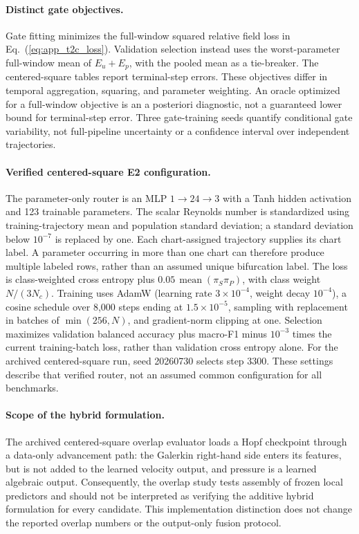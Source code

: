 \documentclass{article}
\def\plaineqref#1{\ref{#1}}
\begin{document}
\paragraph{Distinct gate objectives.}
Gate fitting minimizes the full-window squared relative field loss in Eq.~(\plaineqref{eq:app_t2c_loss}). Validation selection instead uses the worst-parameter full-window mean of $E_u+E_p$, with the pooled mean as a tie-breaker. The centered-square tables report terminal-step errors. These objectives differ in temporal aggregation, squaring, and parameter weighting. An oracle optimized for a full-window objective is an a posteriori diagnostic, not a guaranteed lower bound for terminal-step error. Three gate-training seeds quantify conditional gate variability, not full-pipeline uncertainty or a confidence interval over independent trajectories.

\paragraph{Verified centered-square E2 configuration.}
The parameter-only router is an MLP $1\to24\to3$ with a Tanh hidden activation and 123 trainable parameters. The scalar Reynolds number is standardized using training-trajectory mean and population standard deviation; a standard deviation below $10^{-7}$ is replaced by one. Each chart-assigned trajectory supplies its chart label. A parameter occurring in more than one chart can therefore produce multiple labeled rows, rather than an assumed unique bifurcation label. The loss is class-weighted cross entropy plus $0.05\,\operatorname{mean}(\pi_S\pi_P)$, with class weight $N/(3N_c)$. Training uses AdamW (learning rate $3\times10^{-4}$, weight decay $10^{-4}$), a cosine schedule over 8,000 steps ending at $1.5\times10^{-5}$, sampling with replacement in batches of $\min(256,N)$, and gradient-norm clipping at one. Selection maximizes validation balanced accuracy plus macro-F1 minus $10^{-3}$ times the current training-batch loss, rather than validation cross entropy alone. For the archived centered-square run, seed 20260730 selects step 3300. These settings describe that verified router, not an assumed common configuration for all benchmarks.

\paragraph{Scope of the hybrid formulation.}
The archived centered-square overlap evaluator loads a Hopf checkpoint through a data-only advancement path: the Galerkin right-hand side enters its features, but is not added to the learned velocity output, and pressure is a learned algebraic output. Consequently, the overlap study tests assembly of frozen local predictors and should not be interpreted as verifying the additive hybrid formulation for every candidate. This implementation distinction does not change the reported overlap numbers or the output-only fusion protocol.
\end{document}
